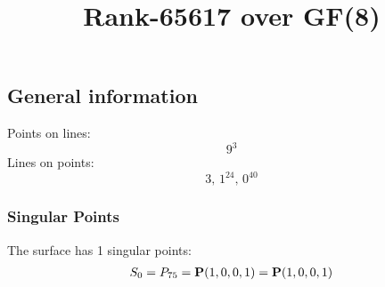\documentclass{article}
\newcommand\setTBstruts{\def\T{\rule{0pt}{2.6ex}}%
\def\B{\rule[-1.2ex]{0pt}{0pt}}}
\newcommand{\bP}{{\bf P}}
\begin{document}
 
\setTBstruts



{\allowdisplaybreaks%






\title{Rank-65617 over GF(8)}
\author{}%
\maketitle%
%
{}



\subsection*{General information}
Points on lines:
$$
9^3$$
Lines on points:
$$
3,\,1^{24},\,0^{40}$$
\subsubsection*{Singular Points}
The surface has 1 singular points:\\
\begin{align*}
S_{0} &= P_{75}=\bP(1, 0, 0, 1) = \bP(1, 0, 0, 1)\\
\end{align*}
}
\end{document}
